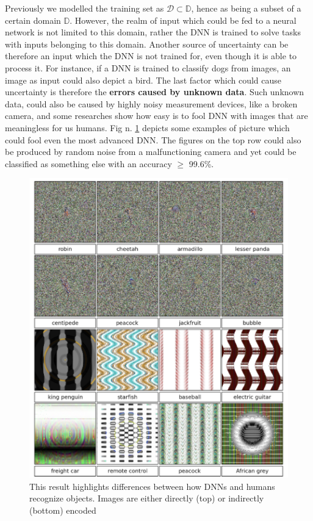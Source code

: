Previously we modelled the training set as $\mathcal{D} \subset \mathbb{D}$, hence as being a subset of a certain domain $\mathbb{D}$. However, the realm of input which could be fed to a neural network is not limited to this domain, rather the DNN is trained to solve tasks with inputs belonging to this domain. Another source of uncertainty can be therefore an input which the DNN is not trained for, even though it is able to process it. For instance, if a DNN is trained to classify dogs from images, an image as input could also depict a bird. The last factor which could cause uncertainty is therefore the \textbf{errors caused by unknown data}. Such unknown data, could also be caused by highly noisy measurement devices, like a broken camera, and some researches show how easy is to fool DNN with images that are meaningless for us humans.\cite{nguyen2015deep} Fig n. \ref{fig:fooling_DNN} depicts some examples of picture which could fool even the most advanced DNN. The figures on the top row could also be produced by random noise from a malfunctioning camera and yet could be classified as something else with an accuracy $\geq$ 99.6\%. \cite{nguyen2015deep}\\
\begin{figure}[htb]
    \centering
    \includegraphics[scale = 0.4]{img/images_fooling_DNN.png}
    \caption[Differences between how DNNs and humans recognize objects]{This result highlights differences between how DNNs and humans recognize objects. Images are either directly (top) or indirectly (bottom) encoded \cite{nguyen2015deep}}
    \label{fig:fooling_DNN}
\end{figure}

